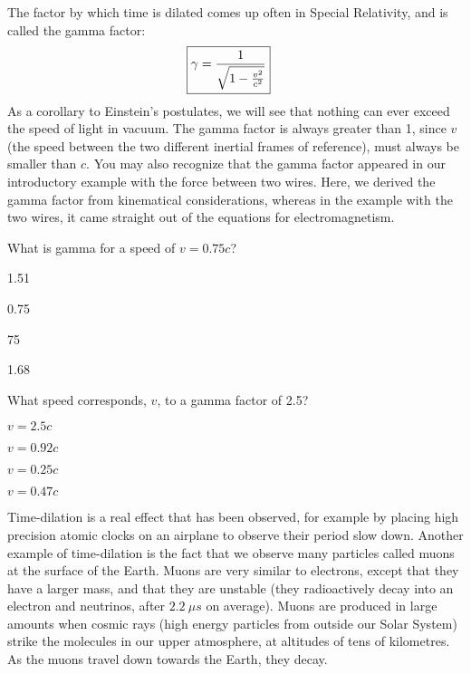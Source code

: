 The factor by which time is dilated comes up often in Special Relativity, and is called the gamma factor:
\begin{align*}
\Aboxed{\gamma = \frac{1}{\sqrt{1-\frac{v^2}{c^2}}}}
\end{align*}
As a corollary to Einstein's postulates, we will see that nothing can ever exceed the speed of light in vacuum. The gamma factor is always greater than 1, since $v$ (the speed between the two different inertial frames of reference), must always be smaller than $c$. You may also recognize that the gamma factor appeared in our introductory example with the force between two wires. Here, we derived the gamma factor from kinematical considerations, whereas in the example with the two wires, it came straight out of the equations for electromagnetism.

\begin{checkpoint}{}
	\begin{MCquestion}{What is gamma for a speed of $v=0.75c$?}
		\item 1.51 \correct
		\item 0.75
		\item 75
		\item 1.68
	\end{MCquestion}
\end{checkpoint}
\begin{checkpoint}{}

	\begin{MCquestion}{What speed corresponds, $v$, to a gamma factor of \SI{2.5}{}?}
		\item $v=2.5c$
		\item $v=0.92c$ \correct
		\item $v=0.25c$
		\item $v=0.47c$
	\end{MCquestion}
\end{checkpoint}

Time-dilation is a real effect that has been observed, for example by placing high precision atomic clocks on an airplane to observe their period slow down. Another example of time-dilation is the fact that we observe many particles called muons at the surface of the Earth. Muons are very similar to electrons, except that they have a larger mass, and that they are unstable (they radioactively decay into an electron and neutrinos, after $\SI{2.2}{\mu s}$ on average). Muons are produced in large amounts when cosmic rays (high energy particles from outside our Solar System) strike the molecules in our upper atmosphere, at altitudes of tens of kilometres. As the muons travel down towards the Earth, they decay.

